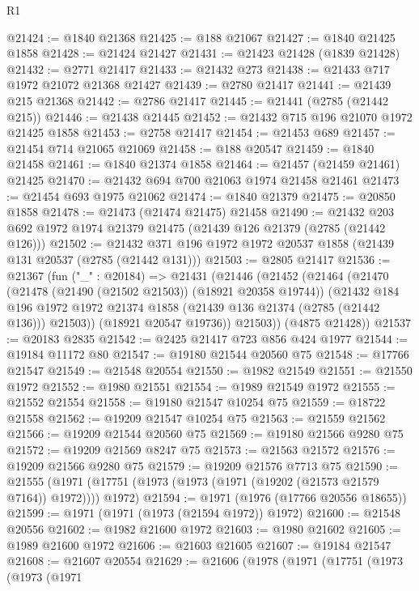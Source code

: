 \begin{lexlean}{R1}
\begin{coremodule}
@21424 := @1840 @21368
@21425 := @188 @21067
@21427 := @1840 @21425 @1858
@21428 := @21424 @21427
@21431 := @21423 @21428 (@1839 @21428)
@21432 := @2771 @21417
@21433 := @21432 @273
@21438 := @21433 @717 @1972 @21072 @21368 @21427
@21439 := @2780 @21417
@21441 := @21439 @215 @21368
@21442 := @2786 @21417
@21445 := @21441 (@2785 (@21442 @215))
@21446 := @21438 @21445
@21452 := @21432 @715 @196 @21070 @1972 @21425 @1858
@21453 := @2758 @21417
@21454 := @21453 @689
@21457 := @21454 @714 @21065 @21069
@21458 := @188 @20547
@21459 := @1840 @21458
@21461 := @1840 @21374 @1858
@21464 := @21457 (@21459 @21461) @21425
@21470 := @21432 @694 @700 @21063 @1974 @21458 @21461
@21473 := @21454 @693 @1975 @21062
@21474 := @1840 @21379
@21475 := @20850 @1858
@21478 := @21473 (@21474 @21475) @21458
@21490 := @21432 @203 @692 @1972 @1974 @21379 @21475 (@21439 @126 @21379 (@2785 (@21442 @126)))
@21502 := @21432 @371 @196 @1972 @1972 @20537 @1858 (@21439 @131 @20537 (@2785 (@21442 @131)))
@21503 := @2805 @21417
@21536 := @21367
    (fun ("_" : @20184) =>
    @21431
      (@21446
        (@21452
          (@21464
            (@21470
              (@21478 (@21490 (@21502 @21503)) (@18921 @20358 @19744))
              (@21432
                @184
                @196
                @1972
                @1972
                @21374
                @1858
                (@21439 @136 @21374 (@2785 (@21442 @136)))
                @21503))
            (@18921 @20547 @19736))
          @21503))
      (@4875 @21428))
@21537 := @20183 @2835
@21542 := @2425 @21417 @723 @856 @424 @1977
@21544 := @19184 @11172 @80
@21547 := @19180 @21544 @20560 @75
@21548 := @17766 @21547
@21549 := @21548 @20554
@21550 := @1982 @21549
@21551 := @21550 @1972
@21552 := @1980 @21551
@21554 := @1989 @21549 @1972
@21555 := @21552 @21554
@21558 := @19180 @21547 @10254 @75
@21559 := @18722 @21558
@21562 := @19209 @21547 @10254 @75
@21563 := @21559 @21562
@21566 := @19209 @21544 @20560 @75
@21569 := @19180 @21566 @9280 @75
@21572 := @19209 @21569 @8247 @75
@21573 := @21563 @21572
@21576 := @19209 @21566 @9280 @75
@21579 := @19209 @21576 @7713 @75
@21590 := @21555 (@1971 (@17751 (@1973 (@1973 (@1971 (@19202 (@21573 @21579 @7164)) @1972)))) @1972)
@21594 := @1971 (@1976 (@17766 @20556 @18655))
@21599 := @1971 (@1971 (@1973 (@21594 @1972)) @1972)
@21600 := @21548 @20556
@21602 := @1982 @21600 @1972
@21603 := @1980 @21602
@21605 := @1989 @21600 @1972
@21606 := @21603 @21605
@21607 := @19184 @21547
@21608 := @21607 @20554
@21629 := @21606
    (@1978
      (@1971
        (@17751
          (@1973
            (@1973
              (@1971

\end{coremodule}
\end{lexlean}
